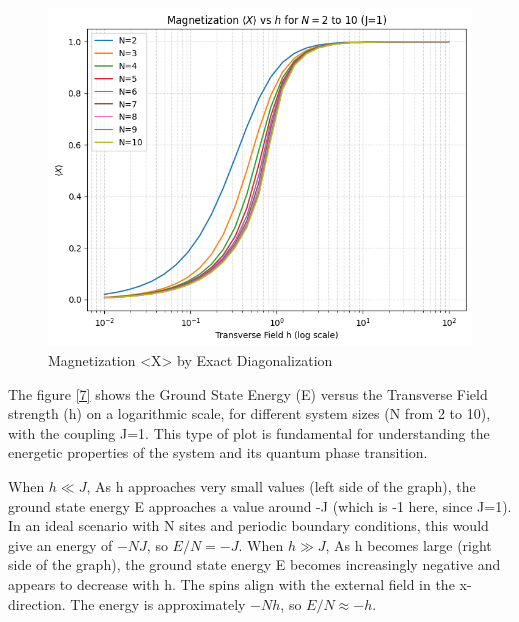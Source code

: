 \documentclass[pre,twocolumn,floatfix]{revtex4-1}
\begin{document}
\begin{figure}[H]
    \centering
    \includegraphics[width=0.5\linewidth]{images/classical_solution.png}
    \caption{Magnetization <X> by Exact Diagonalization}
    \label{6}
\end{figure}

The figure \ref{7} shows the Ground State Energy (E) versus the Transverse Field strength (h) on a logarithmic scale, for different system sizes (N from 2 to 10), with the coupling J=1. This type of plot is fundamental for understanding the energetic properties of the system and its quantum phase transition.

When $h\ll J$, As h approaches very small values (left side of the graph), the ground state energy E approaches a value around -J (which is -1 here, since J=1). In an ideal scenario with N sites and periodic boundary conditions, this would give an energy of $-NJ$, so $E/N=-J$. When $h \gg J$, As h becomes large (right side of the graph), the ground state energy E becomes increasingly negative and appears to decrease with h. The spins align with the external field in the x-direction. The energy is approximately $-Nh$, so $E/N \approx-h$.
\end{document}
